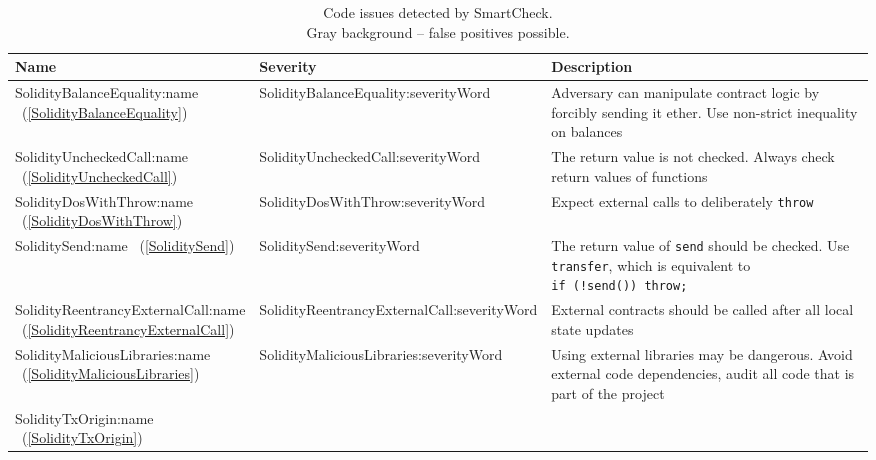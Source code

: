 \begin{table}[]
	\centering
	\caption{Code issues detected by SmartCheck. \\ Gray background -- false positives possible. }
	\begin{tabular}{|p{0.25\linewidth}|p{0.1\linewidth}|p{0.65\linewidth}|}
		\hline
		\textbf{Name} & \textbf{Severity} & \textbf{Description} \\
		\hline
		\usevalue SolidityBalanceEquality:name ~(\ref{SolidityBalanceEquality}) %
		&
		\usevalue SolidityBalanceEquality:severityWord 
		&
		Adversary can manipulate contract logic by forcibly sending it ether.
		Use non-strict inequality on balances
		\\
		\hline
		\rowcolor{lightlightgray}
		\usevalue SolidityUncheckedCall:name ~(\ref{SolidityUncheckedCall})
		&
		\usevalue SolidityUncheckedCall:severityWord 
		&
		The return value is not checked.
		Always check return values of functions
		\\
		\hline
		\rowcolor{lightlightgray}
		\usevalue SolidityDosWithThrow:name ~(\ref{SolidityDosWithThrow})
		&
		\usevalue SolidityDosWithThrow:severityWord 
		&
		Expect external calls to deliberately \texttt{throw}
		\\
		\hline
		\rowcolor{lightlightgray}
		\usevalue SoliditySend:name ~(\ref{SoliditySend})
		&
		\usevalue SoliditySend:severityWord 
		&
		The return value of \texttt{send} should be checked.
		Use \texttt{transfer}, which is equivalent to \texttt{if~(!send())~throw;}
		\\
		\hline
		\rowcolor{lightlightgray}
		\usevalue SolidityReentrancyExternalCall:name ~(\ref{SolidityReentrancyExternalCall})
		&
		\usevalue SolidityReentrancyExternalCall:severityWord 
		&
		External contracts should be called after all local state updates
		\\
		\hline
		\rowcolor{lightlightgray}
		\usevalue SolidityMaliciousLibraries:name ~(\ref{SolidityMaliciousLibraries})
		&
		\usevalue SolidityMaliciousLibraries:severityWord 
		&
		Using external libraries may be dangerous.
		Avoid external code dependencies, audit all code that is part of the project
		\\
		\hline
		\usevalue SolidityTxOrigin:name ~(\ref{SolidityTxOrigin})

\end{tabular}
\end{table}
